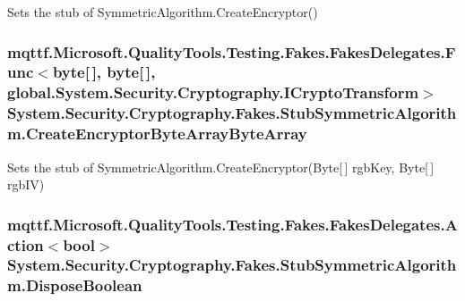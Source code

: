 Sets the stub of Symmetric\-Algorithm.\-Create\-Encryptor()

\hypertarget{class_system_1_1_security_1_1_cryptography_1_1_fakes_1_1_stub_symmetric_algorithm_a988c4d07dd356c8d91f1b124d02994d0}{
\subsubsection[{Create\-Encryptor\-Byte\-Array\-Byte\-Array}]{\setlength{\rightskip}{0pt plus 5cm}mqttf.\-Microsoft.\-Quality\-Tools.\-Testing.\-Fakes.\-Fakes\-Delegates.\-Func$<$byte\mbox{[}$\,$\mbox{]}, byte\mbox{[}$\,$\mbox{]}, global.\-System.\-Security.\-Cryptography.\-I\-Crypto\-Transform$>$ System.\-Security.\-Cryptography.\-Fakes.\-Stub\-Symmetric\-Algorithm.\-Create\-Encryptor\-Byte\-Array\-Byte\-Array}}\label{class_system_1_1_security_1_1_cryptography_1_1_fakes_1_1_stub_symmetric_algorithm_a988c4d07dd356c8d91f1b124d02994d0}


Sets the stub of Symmetric\-Algorithm.\-Create\-Encryptor(\-Byte\mbox{[}$\,$\mbox{]} rgb\-Key, Byte\mbox{[}$\,$\mbox{]} rgb\-I\-V)

\hypertarget{class_system_1_1_security_1_1_cryptography_1_1_fakes_1_1_stub_symmetric_algorithm_a60a8d5e382e700431fc73137fa651964}{
\subsubsection[{Dispose\-Boolean}]{\setlength{\rightskip}{0pt plus 5cm}mqttf.\-Microsoft.\-Quality\-Tools.\-Testing.\-Fakes.\-Fakes\-Delegates.\-Action$<$bool$>$ System.\-Security.\-Cryptography.\-Fakes.\-Stub\-Symmetric\-Algorithm.\-Dispose\-Boolean}}\label{class_system_1_1_security_1_1_cryptography_1_1_fakes_1_1_stub_symmetric_algorithm_a60a8d5e382e700431fc73137fa651964}


